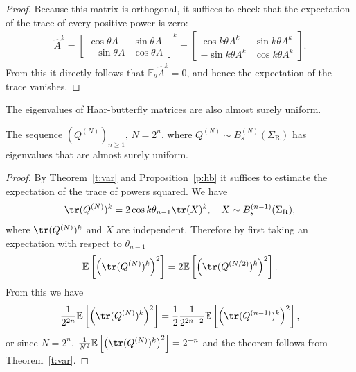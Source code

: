 \begin{proof}
Because this matrix is orthogonal, it suffices to check that the expectation of the trace of every positive power is zero:
\begin{align}
\hat A^k = \begin{bmatrix} \cos \theta A & \sin \theta A \\ - \sin \theta A & \cos \theta A \end{bmatrix}^k = \begin{bmatrix} \cos k\theta A^k & \sin k\theta A^k \\ - \sin k\theta A^k & \cos k\theta A^k \end{bmatrix}.
\end{align}
From this it directly follows that $\mathbb E_\theta \hat A^k = 0$, and hence the expectation of the trace vanishes.
\end{proof}

The eigenvalues of Haar-butterfly matrices are also almost surely uniform.

\begin{theorem}  
The sequence $(Q^{(N)})_{n \geq 1}$, $N = 2^n$, where $Q^{(N)} \sim B_s^{(N)}(\Sigma_{\mathrm{R}})$ has eigenvalues that are almost surely uniform.
\end{theorem}

\begin{proof}
By Theorem~\ref{t:var} and Proposition~\ref{p:hb} it suffices to estimate the expectation of the trace of powers squared.  We have
\begin{align}\label{e:tr-struct}
\tr (Q^{(N)})^k = 2 \cos k \theta_{n-1} \tr (X)^k, \quad X \sim B_s^{(n-1)}(\Sigma_{\mathrm{R}}),
\end{align}
 where $\tr (Q^{(N)})^k$ and $X$ are independent. Therefore by first taking an expectation with respect to $\theta_{n-1}$
\begin{align}
\mathbb E  \left[ \left( \tr (Q^{(N)})^k \right)^2 \right] = 2 \mathbb E \left[ \left( \tr (Q^{(N/2)})^k \right)^2 \right].
 \end{align}
 From this we have
 \begin{align}\label{e:intout}
 \frac{1}{2^{2n}}\mathbb E\left[ \left( \tr (Q^{(N)})^k \right)^2 \right] = \frac{1}{2}  \frac{1}{2^{2n-2}} \mathbb E \left[ \left( \tr (Q^{(n-1)})^k \right)^2 \right],
 \end{align}
 or since $N = 2^{n}$, $\frac{1}{N^2}\mathbb E \left[ \left( \tr (Q^{(N)})^k \right)^2 \right] = 2^{-n}$ and the theorem follows from Theorem~\ref{t:var}.
\end{proof}

